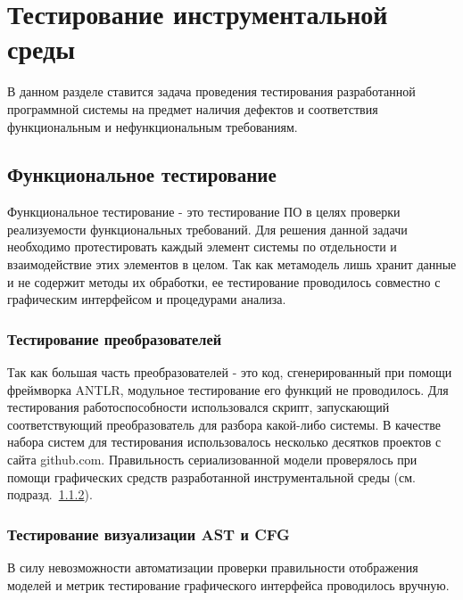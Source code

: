 \chapter{Тестирование инструментальной среды}
\label{chap:testing}

В данном разделе ставится задача проведения тестирования разработанной
программной системы на предмет наличия дефектов и соответствия функциональным
и нефункциональным требованиям.

\section{Функциональное тестирование}

Функциональное тестирование - это тестирование ПО в целях проверки реализуемости
функциональных требований. Для решения данной задачи необходимо протестировать
каждый элемент системы по отдельности и взаимодействие этих элементов в целом.
Так как метамодель лишь хранит данные и не содержит методы их обработки, ее
тестирование проводилось совместно с графическим интерфейсом и процедурами
анализа.

\subsection{Тестирование преобразователей}

Так как большая часть преобразователей - это код, сгенерированный при помощи
фреймворка ANTLR, модульное тестирование его функций не проводилось. Для
тестирования работоспособности использовался скрипт, запускающий соответствующий
преобразователь для разбора какой-либо системы. В качестве набора систем для
тестирования использовалось несколько десятков проектов с сайта github.com.
Правильность сериализованной модели проверялось при помощи графических средств
разработанной инструментальной среды (см. подразд.~\ref{subsec:graph_test}).

\subsection{Тестирование визуализации AST и CFG}
\label{subsec:graph_test}

В силу невозможности автоматизации проверки правильности отображения моделей и
метрик тестирование графического интерфейса проводилось вручную.

